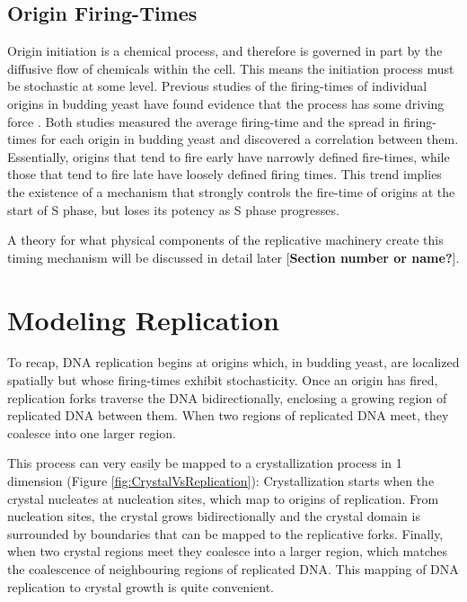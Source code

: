 		\subsection{Origin Firing-Times}
		\label{subsec:OriginTimes}
		
		Origin initiation is a chemical process, and therefore is governed in part by the diffusive flow of chemicals within the cell.
		This means the initiation process must be stochastic at some level.
		Previous studies of the firing-times of individual origins in budding yeast have found evidence that the process has some driving force \cite{ScottsPaper,StochasticTermination}.
		Both studies measured the average firing-time and the spread in firing-times for each origin in budding yeast and discovered a correlation between them.
		Essentially, origins that tend to fire early have narrowly defined fire-times, while those that tend to fire late have loosely defined firing times.
		This trend implies the existence of a mechanism that strongly controls the fire-time of origins at the start of S phase, but loses its potency as S phase progresses.
		
		A theory for what physical components of the replicative machinery create this timing mechanism will be discussed in detail later [\textbf{Section number or name?}].
		
		
	\section{Modeling Replication}
	\label{sec:Modeling}
	
	To recap, DNA replication begins at origins which, in budding yeast, are localized spatially but whose firing-times exhibit stochasticity.
	Once an origin has fired, replication forks traverse the DNA bidirectionally, enclosing a growing region of replicated DNA between them.
	When two regions of replicated DNA meet, they coalesce into one larger region.
	
	This process can very easily be mapped to a crystallization process in 1 dimension (Figure \ref{fig:CrystalVsReplication}):
	Crystallization starts when the crystal nucleates at nucleation sites, which map to origins of replication.
	From nucleation sites, the crystal grows bidirectionally and the crystal domain is surrounded by boundaries that can be mapped to the replicative forks.
	Finally, when two crystal regions meet they coalesce into a larger region, which matches the coalescence of neighbouring regions of replicated DNA.
	This mapping of DNA replication to crystal growth is quite convenient.
	
